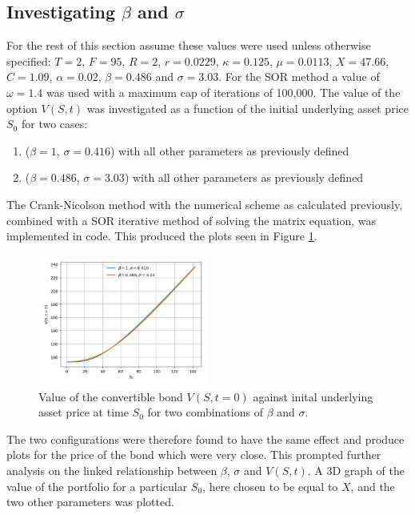 \documentclass{article}
\begin{document}
\subsection{Investigating $\beta$ and $\sigma$}
For the rest of this section assume these values were used unless otherwise specified:
$T=2$, $F=95$, $R=2$, $r=0.0229$, $\kappa=0.125$, $\mu=0.0113$, $X=47.66$, $C=1.09$, $\alpha=0.02$, $\beta=0.486$ and $\sigma=3.03$.
For the SOR method a value of $\omega=1.4$ was used with a maximum cap of iterations of 100,000.
The value of the option $V(S,t)$ was investigated as a function of the initial underlying asset
price $S_0$ for two cases:
\begin{enumerate}[1)]
  \item ($\beta=1$, $\sigma=0.416$) with all other parameters as previously defined
  \item ($\beta=0.486$, $\sigma=3.03$) with all other parameters as previously defined
\end{enumerate}
\par The Crank-Nicolson method with the numerical scheme as calculated previously, combined with a SOR iterative method of solving the matrix equation, was implemented in code.
This produced the plots seen in Figure \ref{fig:varying_s}.
\begin{figure}[!t]
\includegraphics[width=0.5\textwidth,center]{../images/european_varying_s.png}
\caption{Value of the convertible bond $V(S,t=0)$ against inital underlying asset price at time $S_0$ for two combinations of $\beta$ and $\sigma$.}
\label{fig:varying_s}
\end{figure}
The two configurations were therefore found to have the same effect and produce plots for the price of the bond which were very close.
This prompted further analysis on the linked relationship between $\beta$, $\sigma$ and $V(S,t)$.
A 3D graph of the value of the portfolio for a particular $S_0$, here chosen to be equal to $X$, and the two other parameters was plotted.
\end{document}
